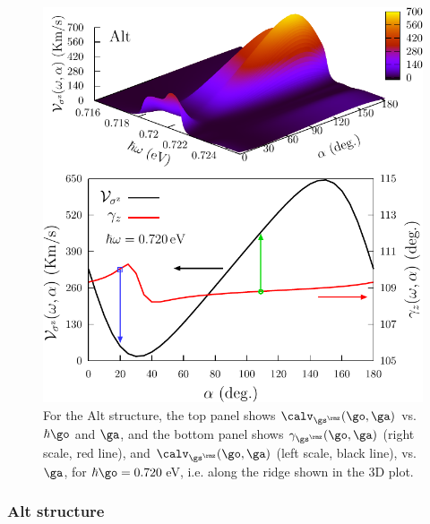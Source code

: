 \documentclass[prb,11pt,tightenlines,twocolumn,aps]{revtex4-1}
\begin{document}
\begin{figure}[tb]
\centering
\includegraphics[width=\linewidth]{altplots/alt-vsz}
\caption{For the Alt structure, the top panel shows $\calv_{\gs^\rmz}
(\go,\ga)$ vs. $\hbar\go$ and $\ga$, and the bottom panel shows
$\gamma_{\gs^\rmz} (\go,\ga)$ (right scale, red line), and $\calv_{\gs^\rmz}
(\go,\ga)$ (left scale, black line), vs. $\ga$, for $\hbar\go=0.720$\,eV, i.e.
along the ridge shown in the 3D plot.}
\label{fig:alt-vsz}
\end{figure}

\subsubsection{Alt structure}
\end{document}

